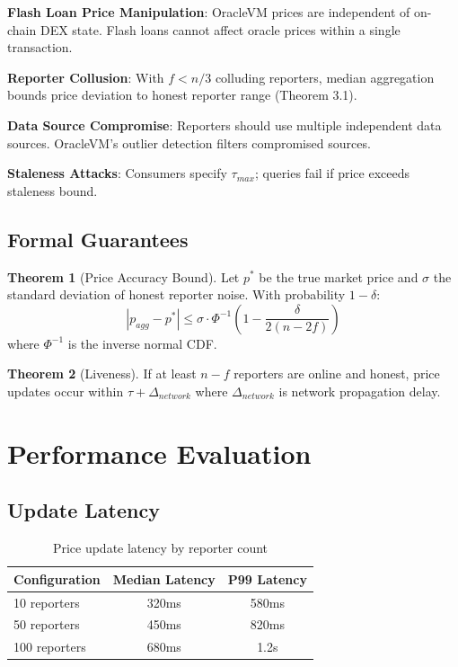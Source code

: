 \documentclass[11pt,a4paper]{article}
\theoremstyle{definition}
\newtheorem{theorem}{Theorem}
\begin{document}
\textbf{Flash Loan Price Manipulation}:
OracleVM prices are independent of on-chain DEX state. Flash loans cannot affect oracle prices within a single transaction.

\textbf{Reporter Collusion}:
With $f < n/3$ colluding reporters, median aggregation bounds price deviation to honest reporter range (Theorem 3.1).

\textbf{Data Source Compromise}:
Reporters should use multiple independent data sources. OracleVM's outlier detection filters compromised sources.

\textbf{Staleness Attacks}:
Consumers specify $\tau_{max}$; queries fail if price exceeds staleness bound.

\subsection{Formal Guarantees}

\begin{theorem}[Price Accuracy Bound]
Let $p^*$ be the true market price and $\sigma$ the standard deviation of honest reporter noise. With probability $1 - \delta$:
\[
|p_{agg} - p^*| \leq \sigma \cdot \Phi^{-1}\left(1 - \frac{\delta}{2(n-2f)}\right)
\]
where $\Phi^{-1}$ is the inverse normal CDF.
\end{theorem}

\begin{theorem}[Liveness]
If at least $n - f$ reporters are online and honest, price updates occur within $\tau + \Delta_{network}$ where $\Delta_{network}$ is network propagation delay.
\end{theorem}

\section{Performance Evaluation}

\subsection{Update Latency}

\begin{table}[h]
\centering
\begin{tabular}{@{}lcc@{}}
\toprule
Configuration & Median Latency & P99 Latency \\
\midrule
10 reporters & 320ms & 580ms \\
50 reporters & 450ms & 820ms \\
100 reporters & 680ms & 1.2s \\
\bottomrule
\end{tabular}
\caption{Price update latency by reporter count}
\end{table}
\end{document}
